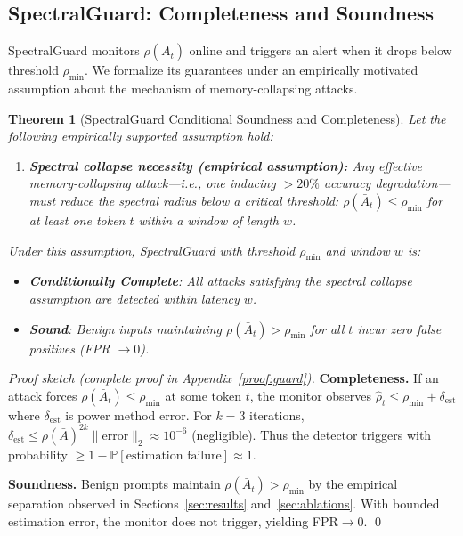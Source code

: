 \documentclass[10pt,twocolumn]{article}
\newtheorem{theorem}{Theorem}
\begin{document}
\subsection{SpectralGuard: Completeness and Soundness}

SpectralGuard monitors $\rho(\bar{A}_t)$ online and triggers an alert when it drops below threshold $\rho_{\min}$. We formalize its guarantees under an empirically motivated assumption about the mechanism of memory-collapsing attacks.

\begin{theorem}[SpectralGuard Conditional Soundness and Completeness]
\label{thm:guard}
Let the following empirically supported assumption hold:
\begin{enumerate}
\item \textbf{Spectral collapse necessity (empirical assumption):} Any effective memory-collapsing attack---i.e., one inducing $>20\%$ accuracy degradation---must reduce the spectral radius below a critical threshold: $\rho(\bar{A}_t) \le \rho_{\min}$ for at least one token $t$ within a window of length $w$.
\end{enumerate}
Under this assumption, SpectralGuard with threshold $\rho_{\min}$ and window $w$ is:
\begin{itemize}
\item \textbf{Conditionally Complete}: All attacks satisfying the spectral collapse assumption are detected within latency $w$.
\item \textbf{Sound}: Benign inputs maintaining $\rho(\bar{A}_t) > \rho_{\min}$ for all $t$ incur zero false positives (FPR $\to 0$).
\end{itemize}
\end{theorem}

\begin{proof}[Proof sketch (complete proof in Appendix~\ref{proof:guard})]
\textbf{Completeness.} If an attack forces $\rho(\bar{A}_t) \le \rho_{\min}$ at some token $t$, the monitor observes $\hat{\rho}_t \le \rho_{\min} + \delta_{\text{est}}$ where $\delta_{\text{est}}$ is power method error. For $k=3$ iterations, $\delta_{\text{est}} \le \rho(\bar{A})^{2k} \|\text{error}\|_2 \approx 10^{-6}$ (negligible). Thus the detector triggers with probability $\ge 1 - \mathbb{P}[\text{estimation failure}] \approx 1$.

\textbf{Soundness.} Benign prompts maintain $\rho(\bar{A}_t) > \rho_{\min}$ by the empirical separation observed in Sections~\ref{sec:results} and~\ref{sec:ablations}. With bounded estimation error, the monitor does not trigger, yielding FPR$\to 0$. \qed
\end{proof}
\end{document}
